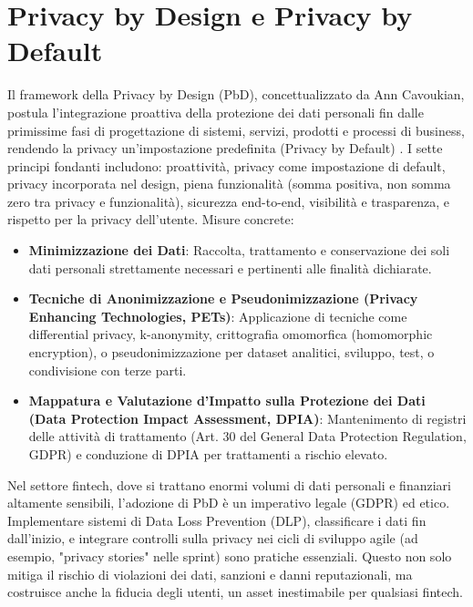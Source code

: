 \section{Privacy by Design e Privacy by Default}
Il framework della Privacy by Design (PbD), concettualizzato da Ann Cavoukian, postula l'integrazione proattiva della protezione dei dati personali fin dalle primissime fasi di progettazione di sistemi, servizi, prodotti e processi di business, rendendo la privacy un'impostazione predefinita (Privacy by Default) \cite{Cavoukian_PbD_2009}. I sette principi fondanti includono: proattività, privacy come impostazione di default, privacy incorporata nel design, piena funzionalità (somma positiva, non somma zero tra privacy e funzionalità), sicurezza end-to-end, visibilità e trasparenza, e rispetto per la privacy dell'utente.
Misure concrete:
\begin{itemize}
\item \textbf{Minimizzazione dei Dati}: Raccolta, trattamento e conservazione dei soli dati personali strettamente necessari e pertinenti alle finalità dichiarate.
\item \textbf{Tecniche di Anonimizzazione e Pseudonimizzazione (Privacy Enhancing Technologies, PETs)}: Applicazione di tecniche come differential privacy, k-anonymity, crittografia omomorfica (homomorphic encryption), o pseudonimizzazione per dataset analitici, sviluppo, test, o condivisione con terze parti.
\item \textbf{Mappatura e Valutazione d'Impatto sulla Protezione dei Dati (Data Protection Impact Assessment, DPIA)}: Mantenimento di registri delle attività di trattamento (Art. 30 del General Data Protection Regulation, GDPR) e conduzione di DPIA per trattamenti a rischio elevato.
\end{itemize}
Nel settore fintech, dove si trattano enormi volumi di dati personali e finanziari altamente sensibili, l'adozione di PbD è un imperativo legale (GDPR) ed etico. Implementare sistemi di Data Loss Prevention (DLP), classificare i dati fin dall'inizio, e integrare controlli sulla privacy nei cicli di sviluppo agile (ad esempio, "privacy stories" nelle sprint) sono pratiche essenziali. Questo non solo mitiga il rischio di violazioni dei dati, sanzioni e danni reputazionali, ma costruisce anche la fiducia degli utenti, un asset inestimabile per qualsiasi fintech.
